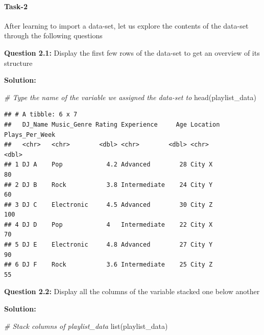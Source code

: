 \documentclass[
]{article}
\newenvironment{Shaded}{\begin{snugshade}}{\end{snugshade}}
\newcommand{\CommentTok}[1]{\textcolor[rgb]{0.56,0.35,0.01}{\textit{#1}}}
\newcommand{\FunctionTok}[1]{\textcolor[rgb]{0.00,0.00,0.00}{#1}}
\newcommand{\NormalTok}[1]{#1}
\begin{document}
\hypertarget{task-2}{%
\paragraph{Task-2}\label{task-2}}

After learning to import a data-set, let us explore the contents of the
data-set through the following questions

\textbf{Question 2.1:} Display the first few rows of the data-set to get
an overview of its structure

\textbf{Solution:}

\begin{Shaded}
\begin{Highlighting}[]
\CommentTok{\# Type the name of the variable we assigned the data{-}set to}
\FunctionTok{head}\NormalTok{(playlist\_data)}
\end{Highlighting}
\end{Shaded}

\begin{verbatim}
## # A tibble: 6 x 7
##   DJ_Name Music_Genre Rating Experience     Age Location Plays_Per_Week
##   <chr>   <chr>        <dbl> <chr>        <dbl> <chr>             <dbl>
## 1 DJ A    Pop            4.2 Advanced        28 City X               80
## 2 DJ B    Rock           3.8 Intermediate    24 City Y               60
## 3 DJ C    Electronic     4.5 Advanced        30 City Z              100
## 4 DJ D    Pop            4   Intermediate    22 City X               70
## 5 DJ E    Electronic     4.8 Advanced        27 City Y               90
## 6 DJ F    Rock           3.6 Intermediate    25 City Z               55
\end{verbatim}

\textbf{Question 2.2:} Display all the columns of the variable stacked
one below another

\textbf{Solution:}

\begin{Shaded}
\begin{Highlighting}[]
\CommentTok{\# Stack columns of playlist\_data}
\FunctionTok{list}\NormalTok{(playlist\_data)}
\end{Highlighting}
\end{Shaded}
\end{document}

